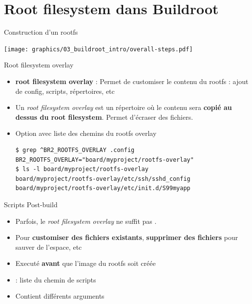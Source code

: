 \documentclass[aspectratio=169,obeyspaces,spaces,hyphens,dvipsnames]{beamer}
\begin{document}
\section{Root filesystem dans Buildroot}

\begin{frame}{Construction d'un rootfs}
  \begin{center}
    \texttt{[image: graphics/03\_buildroot\_intro/overall-steps.pdf]}
  \end{center}
\end{frame}

\begin{frame}[fragile]{Root filesystem overlay}
  \begin{itemize}
  \item  {\bf root filesystem overlay} : Permet de customiser le contenu
    du rootfs : ajout de config, scripts, répertoires, etc
  \item Un {\em root filesystem overlay} est un répertoire où le contenu sera
    {\bf copié au dessus du root filesystem}. Permet d'écraser des fichiers.
  \item Option  avec liste des chemins du rootfs overlay
    \begin{block}{}
      {\small
\begin{verbatim}
$ grep ^BR2_ROOTFS_OVERLAY .config
BR2_ROOTFS_OVERLAY="board/myproject/rootfs-overlay"
$ ls -l board/myproject/rootfs-overlay
board/myproject/rootfs-overlay/etc/ssh/sshd_config
board/myproject/rootfs-overlay/etc/init.d/S99myapp
\end{verbatim}}
      \end{block}
    \end{itemize}
  \end{frame}

\begin{frame}{Scripts Post-build}
  \begin{itemize}
  \item Parfois, le {\em root filesystem overlay} ne suffit pas
    .
  \item Pour {\bf customiser des fichiers existants}, {\bf supprimer
      des fichiers} pour sauver de l'espace, etc
  \item Executé \textbf{avant} que l'image du rootfs soit créée
  \item {} : liste du chemin de scripts
  \item Contient différents arguments
  \end{itemize}
\end{frame}
\end{document}
